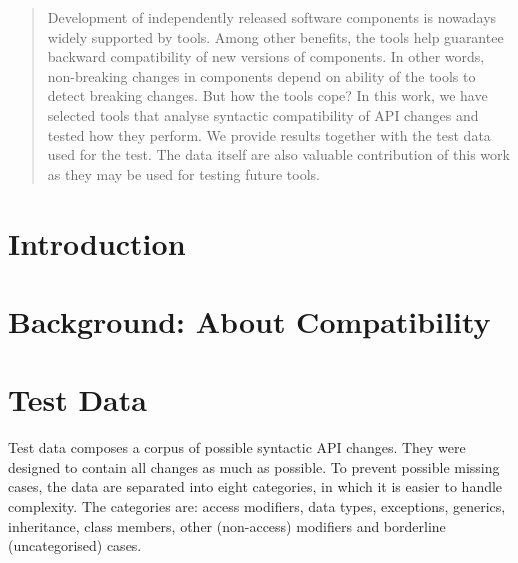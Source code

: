 \documentclass[conference]{IEEEtran}
\begin{document}




\maketitle

\begin{abstract}
Development of independently released software components is nowadays widely supported by tools.
Among other benefits, the tools help guarantee backward compatibility of new versions of components. 
In other words, non-breaking changes in components depend on ability of the tools to detect breaking changes.
But how the tools cope? In this work, we have selected tools that analyse syntactic compatibility of API changes
and tested how they perform. We provide results together with the test data used for the test. The data itself
are also valuable contribution of this work as they may be used for testing future tools.
\end{abstract}





%
\IEEEpeerreviewmaketitle

\section{Introduction}

\section{Background: About Compatibility}

\section{Test Data}

Test data composes a corpus of possible syntactic API changes. They were designed to contain all changes as much as possible. To prevent possible missing cases, the data are separated into eight categories, in which it is easier to handle complexity. The categories are: access modifiers, data types, exceptions, generics, inheritance, class members, other (non-access) modifiers and borderline (uncategorised) cases. 
\end{document}
